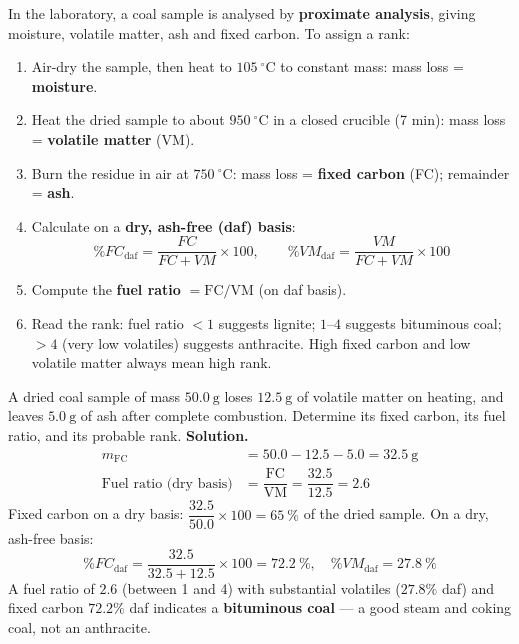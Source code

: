 \documentclass[11pt]{article}
\begin{document}
\begin{methode}
In the laboratory, a coal sample is analysed by \textbf{proximate analysis}, giving moisture, volatile matter, ash and fixed carbon. To assign a rank:
\begin{enumerate}
\item Air-dry the sample, then heat to $\SI{105}{\ensuremath{{}^{\circ}\mathrm{C}}}$ to constant mass: mass loss = \textbf{moisture}.
\item Heat the dried sample to about $\SI{950}{\ensuremath{{}^{\circ}\mathrm{C}}}$ in a closed crucible (7 min): mass loss = \textbf{volatile matter} (VM).
\item Burn the residue in air at $\SI{750}{\ensuremath{{}^{\circ}\mathrm{C}}}$: mass loss = \textbf{fixed carbon} (FC); remainder = \textbf{ash}.
\item Calculate on a \textbf{dry, ash-free (daf) basis}:
\[
\%FC_{\mathrm{daf}} = \frac{FC}{FC+VM}\times 100,\qquad
\%VM_{\mathrm{daf}} = \frac{VM}{FC+VM}\times 100
\]
\item Compute the \textbf{fuel ratio} $= \mathrm{FC}/\mathrm{VM}$ (on daf basis).
\item Read the rank: fuel ratio $< 1$ suggests lignite; $1$--$4$ suggests bituminous coal; $> 4$ (very low volatiles) suggests anthracite. High fixed carbon and low volatile matter always mean high rank.
\end{enumerate}
\end{methode}

\begin{exoresolu}
A dried coal sample of mass $50.0\ \mathrm{g}$ loses $12.5\ \mathrm{g}$ of volatile matter on heating, and leaves $5.0\ \mathrm{g}$ of ash after complete combustion. Determine its fixed carbon, its fuel ratio, and its probable rank.
\tcblower
\textbf{Solution.}
\begin{align*}
m_{\mathrm{FC}} &= 50.0 - 12.5 - 5.0 = 32.5\ \mathrm{g}\\
\text{Fuel ratio (dry basis)} &= \dfrac{\mathrm{FC}}{\mathrm{VM}} = \dfrac{32.5}{12.5} = 2.6
\end{align*}
Fixed carbon on a dry basis: $\dfrac{32.5}{50.0}\times 100 = 65\ \%$ of the dried sample. On a dry, ash-free basis:
\[
\%FC_{\mathrm{daf}} = \frac{32.5}{32.5+12.5}\times 100 = 72.2\ \%,\quad
\%VM_{\mathrm{daf}} = 27.8\ \%
\]
A fuel ratio of $2.6$ (between 1 and 4) with substantial volatiles ($27.8\%$ daf) and fixed carbon $72.2\%$ daf indicates a \textbf{bituminous coal} --- a good steam and coking coal, not an anthracite.
\end{exoresolu}
\end{document}
